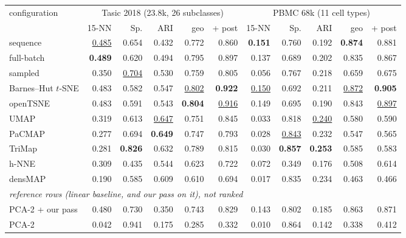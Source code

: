 \begin{tabular}{lrrrrrrrrrr}
\toprule
configuration & \multicolumn{5}{c}{Tasic 2018 (23.8k, 26 subclasses)} & \multicolumn{5}{c}{PBMC 68k (11 cell types)} \\
 & 15-NN & Sp. & ARI & geo & + post & 15-NN & Sp. & ARI & geo & + post \\
\midrule
\magnet{} sequence & \underline{0.485} & 0.654 & 0.432 & 0.772 & 0.860 & \textbf{0.151} & 0.760 & 0.192 & \textbf{0.874} & 0.881 \\
\magnet{} full-batch & \textbf{0.489} & 0.620 & 0.494 & 0.795 & 0.897 & 0.137 & 0.689 & 0.202 & 0.835 & 0.867 \\
\magnet{} sampled & 0.350 & \underline{0.704} & 0.530 & 0.759 & 0.805 & 0.056 & 0.767 & 0.218 & 0.659 & 0.675 \\
Barnes--Hut $t$-SNE & 0.483 & 0.582 & 0.547 & \underline{0.802} & \textbf{0.922} & \underline{0.150} & 0.692 & 0.211 & \underline{0.872} & \textbf{0.905} \\
openTSNE & 0.483 & 0.591 & 0.543 & \textbf{0.804} & \underline{0.916} & 0.149 & 0.695 & 0.190 & 0.843 & \underline{0.897} \\
UMAP & 0.319 & 0.613 & \underline{0.647} & 0.751 & 0.845 & 0.033 & 0.818 & \underline{0.240} & 0.580 & 0.590 \\
PaCMAP & 0.277 & 0.694 & \textbf{0.649} & 0.747 & 0.793 & 0.028 & \underline{0.843} & 0.232 & 0.547 & 0.565 \\
TriMap & 0.281 & \textbf{0.826} & 0.632 & 0.789 & 0.815 & 0.030 & \textbf{0.857} & \textbf{0.253} & 0.585 & 0.583 \\
h-NNE & 0.309 & 0.435 & 0.544 & 0.623 & 0.722 & 0.072 & 0.349 & 0.176 & 0.508 & 0.614 \\
densMAP & 0.190 & 0.585 & 0.609 & 0.610 & 0.694 & 0.017 & 0.835 & 0.234 & 0.463 & 0.466 \\
\midrule
\multicolumn{11}{l}{\emph{reference rows (linear baseline, and our pass on it), not ranked}} \\
PCA-2 + our pass & 0.480 & 0.730 & 0.350 & 0.743 & 0.829 & 0.143 & 0.802 & 0.185 & 0.863 & 0.871 \\
PCA-2 & 0.042 & 0.941 & 0.175 & 0.285 & 0.332 & 0.010 & 0.864 & 0.142 & 0.338 & 0.412 \\
\bottomrule
\end{tabular}

